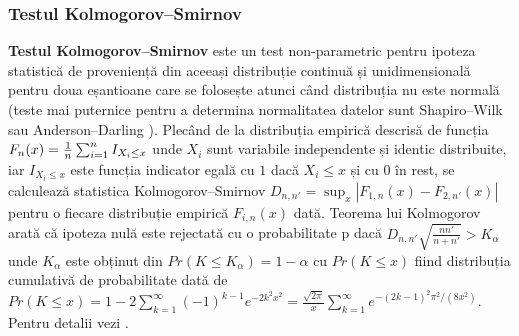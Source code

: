 \documentclass[12pt]{article}
\begin{document}
\subsubsection{Testul Kolmogorov–Smirnov}
 \label{testKS}
 \textbf{Testul Kolmogorov–Smirnov} este un test non-parametric pentru ipoteza statistică de proveniență din aceeași distribuție continuă și unidimensională pentru doua eșantioane care se folosește atunci când distribuția nu este normală (teste mai puternice pentru a determina normalitatea datelor sunt  Shapiro–Wilk sau Anderson–Darling \citep{Stephens74} ). 
 Plecând de la distribuția empirică descrisă de funcția $F_n(x)={1 \over n}\sum_{i=1}^n I_{X_i\leq x}$ unde $X_i$ sunt variabile independente și identic distribuite, iar $I_{X_i\leq x}$ este funcția indicator egală cu $1$ dacă $X_i\leq x$ și cu $0$ în rest, se calculează statistica Kolmogorov–Smirnov $D_{n,n'}=\sup_x |F_{1,n}(x)-F_{2,n'}(x)|$ pentru o fiecare distribuție empirică $F_{i,n}(x)$ dată. 
 Teorema lui Kolmogorov arată că ipoteza nulă este rejectată cu o probabilitate p dacă $D_{n,n'}\sqrt{\frac{n n'}{n + n'}}>K_\alpha$ unde $K_\alpha$ este obținut din $Pr(K\leq K_\alpha)=1-\alpha$ cu $Pr(K\leq x)$ fiind distribuția cumulativă de probabilitate dată de $Pr(K\leq x)=1-2\sum_{k=1}^\infty (-1)^{k-1} e^{-2k^2 x^2}=\frac{\sqrt{2\pi}}{x}\sum_{k=1}^\infty e^{-(2k-1)^2\pi^2/(8x^2)}$. 
 Pentru detalii vezi \citep{stuart99}.
\end{document}

